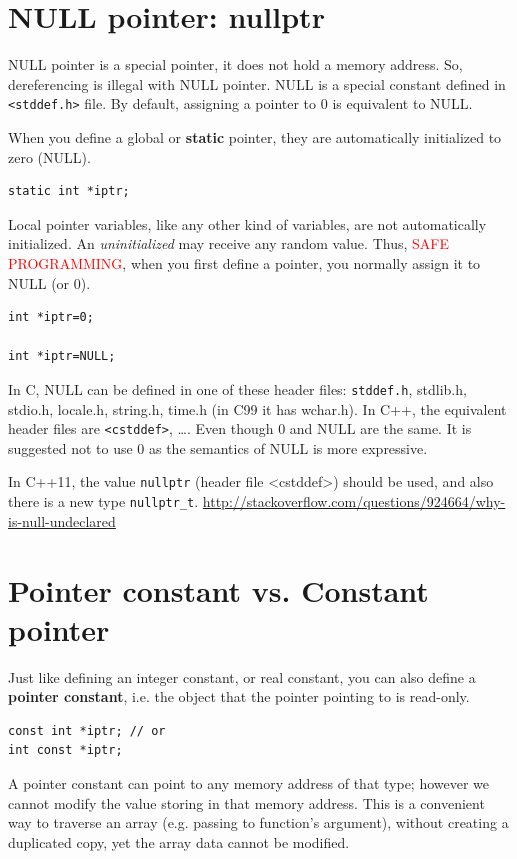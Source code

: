 \section{NULL pointer: nullptr}
\label{sec:null-pointer}
\label{sec:nullptr}

NULL pointer is a special pointer, it does not hold a memory
address. So, dereferencing is illegal with NULL pointer. NULL is a
special constant defined in \verb!<stddef.h>! file. By default, assigning a
pointer to 0 is equivalent to NULL.

When you define a global or {\bf static} pointer, they are
automatically initialized to zero (NULL).
\begin{lstlisting}
static int *iptr;
\end{lstlisting}

Local pointer variables, like any other kind of variables, are not
automatically initialized. An {\it uninitialized} may receive any
random value. Thus, \textcolor{red}{SAFE PROGRAMMING}, when you first
define a pointer, you normally assign it to NULL (or 0).
\begin{lstlisting}
int *iptr=0;

int *iptr=NULL;
\end{lstlisting}

In C, NULL can be defined in one of these header files: \verb!stddef.h!,
stdlib.h, stdio.h, locale.h, string.h, time.h (in C99 it has wchar.h). In C++,
the equivalent header files are \verb!<cstddef>!, \ldots. Even though 0 and NULL
are the same. It is suggested not to use 0 as the semantics of NULL is more
expressive. 

In C++11, the value \verb!nullptr! (header file <cstddef>) should be used, and also there is a new type
\verb!nullptr_t!.
\url{http://stackoverflow.com/questions/924664/why-is-null-undeclared}


\section{Pointer constant vs. Constant pointer}
\label{sec:constant-pointer}

Just like defining an integer constant, or real constant, you can also define a
{\bf pointer constant}, i.e. the object that the pointer pointing to is
read-only.
\begin{lstlisting}
const int *iptr; // or
int const *iptr;
\end{lstlisting}
A pointer constant can point to any memory address of that type;
however we cannot modify the value storing in that memory
address. This is a convenient way to traverse an array (e.g. passing to
function's argument), without creating a duplicated copy, yet the array data
cannot be modified.


